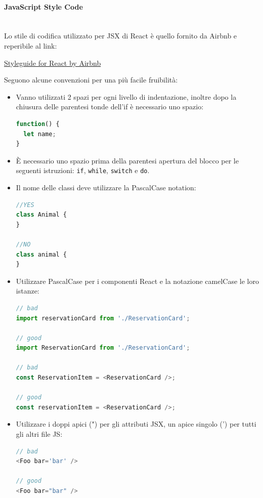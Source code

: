 \paragraph{JavaScript Style Code}\mbox{}\\
Lo stile di codifica utilizzato per JSX di React è quello fornito da Airbnb e reperibile al link:
\begin{center}
\href{https://github.com/airbnb/javascript/tree/master/react}{Styleguide for React by Airbnb}
\end{center}
Seguono alcune convenzioni per una più facile fruibilità: 
\begin{itemize}
	\item Vanno utilizzati 2 spazi per ogni livello di indentazione, inoltre dopo la chiusura delle parentesi tonde dell'if è necessario uno spazio:\\
	\begin{lstlisting}[frame=single, language=JavaScript]
function() {
  let name;
}
	\end{lstlisting}
	\item \uppercase{è} necessario uno spazio prima della parentesi apertura del blocco per le seguenti istruzioni: \texttt{if}, \texttt{while}, \texttt{switch} e \texttt{do}.
	\item Il nome delle classi deve utilizzare la PascalCase notation:
		\begin{lstlisting}[frame=single, language=JavaScript]
//YES
class Animal {
}

//NO
class animal {
}
	\end{lstlisting}
	\item Utilizzare PascalCase per i componenti React e la notazione camelCase le loro istanze:
		\begin{lstlisting}[frame=single, language=JavaScript]
// bad
import reservationCard from './ReservationCard';

// good
import ReservationCard from './ReservationCard';

// bad
const ReservationItem = <ReservationCard />;

// good
const reservationItem = <ReservationCard />;
	\end{lstlisting}
	\item Utilizzare i doppi apici (") per gli attributi JSX, un apice singolo (') per tutti gli altri file JS:
		\begin{lstlisting}[frame=single, language=JavaScript]
// bad
<Foo bar='bar' />

// good
<Foo bar="bar" />


\end{lstlisting}
\end{itemize}
